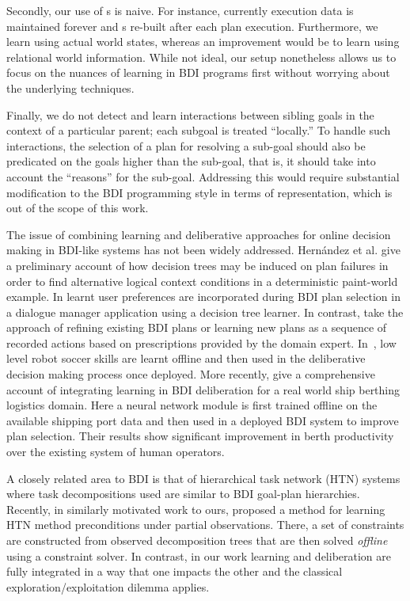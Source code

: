 Secondly, our use of \dt s is naive. 
For instance, currently execution data is maintained forever and 
\dt s re-built after each plan execution. Furthermore, we learn using actual 
world states, whereas an improvement would be to learn using relational world information.
While not ideal, our setup nonetheless allows us to focus on 
the nuances of learning in BDI programs first 
without worrying about the underlying techniques.

Finally, we do not detect and learn interactions between
sibling goals in the context of a particular parent; each
subgoal is treated ``locally.'' To handle such interactions, the
selection of a plan for resolving a sub-goal should also be predicated
on the goals higher than the sub-goal, that is, it should take into
account the ``reasons'' for the sub-goal. Addressing this would require substantial modification to the BDI programming style in terms of representation, which is out of the scope of this work.

The issue of combining learning and deliberative approaches for online 
decision making in BDI-like systems has not been widely addressed.
%
Hern\'andez et al. \cite{Hernandez04:Learning} give a preliminary
account of how decision trees may be induced on plan failures in order
to find alternative logical context conditions in a deterministic
paint-world example. 
%
In \cite{nguyen2006an-ad} learnt user preferences are incorporated during BDI plan selection in a dialogue manager application using a decision tree learner. %
In contrast, \cite{karim2006plans} take the approach of refining existing BDI plans or learning new plans as a sequence of recorded actions based on prescriptions provided by the domain expert.
%
In~\cite{Riedmiller01}, low level robot soccer skills are learnt offline and then used in the deliberative decision making process once deployed.
%
More recently, \cite{lokuge2007impro} give a comprehensive account of integrating learning in BDI deliberation for a real world ship berthing logistics domain. Here a neural network module is first trained offline on the available shipping port data and then used in a deployed BDI system to improve plan selection. Their results show significant improvement in berth productivity over the existing system of human operators.

A closely related area to BDI is that of hierarchical task network (HTN)
systems where task decompositions used are similar to BDI goal-plan hierarchies.
Recently, in similarly motivated work to ours, \cite{Zhuo09:Learning} 
proposed a method for learning HTN method preconditions under partial
observations. There, a set of constraints are constructed from
observed decomposition trees that are then solved \emph{offline} using
a constraint solver.
%
In contrast, in our work learning and deliberation are fully integrated in a
way that one impacts the other and the classical
exploration/exploitation dilemma applies. 

